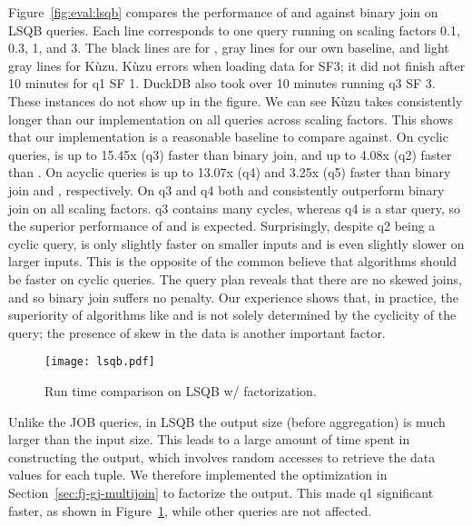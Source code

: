 Figure~\ref{fig:eval:lsqb} compares the performance of \FJ and \GJ against binary join on LSQB queries.
Each line corresponds to one query running on scaling factors 0.1, 0.3, 1, and 3.
The black lines are for \FJ, gray lines for our own \GJ baseline, and light gray lines for K\`uzu.
K\`uzu errors when loading data for SF3;
it did not finish after 10 minutes for q1 SF 1. 
DuckDB also took over 10 minutes running q3 SF 3. 
These instances do not show up in the figure.
We can see K\`uzu takes consistently longer than our \GJ implementation
 on all queries across scaling factors.
This shows that our \GJ implementation is a reasonable baseline to compare against.
On cyclic queries, \FJ is up to 15.45x (q3) faster than binary join, 
  and up to 4.08x (q2) faster than \GJ.
On acyclic queries \FJ is up to 13.07x (q4) and 3.25x (q5) faster than binary join and \GJ, respectively.
On q3 and q4 both \FJ and \GJ consistently outperform binary join on all scaling factors.
q3 contains many cycles, whereas q4 is a star query, so the superior performance of \FJ and \GJ is expected.
Surprisingly, despite q2 being a cyclic query, 
  \FJ is only slightly faster on smaller inputs
  and is even slightly slower on larger inputs.
This is the opposite of the common believe that \WCOJ algorithms
  should be faster on cyclic queries.
The query plan reveals that there are no skewed joins,
  and so binary join suffers no penalty.
Our experience shows that, in practice, 
  the superiority of \WCOJ algorithms like \FJ and \GJ
  is not solely determined by the cyclicity of the query;
  the presence of skew in the data is another important factor.

\begin{figure}
  \centering
  \texttt{[image: lsqb.pdf]}
  \caption{Run time comparison on LSQB w/ factorization.}
  \label{fig:eval:lsqb-factor}
\end{figure}

Unlike the JOB queries, in LSQB the output size (before aggregation)
  is much larger than the input size.
This leads to a large amount of time spent in constructing the output, 
  which involves random accesses to retrieve the data values for each tuple.
We therefore implemented the optimization in Section~\ref{sec:fj-gj-multijoin}
  to factorize the output.
This made q1 significant faster, as shown in Figure~\ref{fig:eval:lsqb-factor},
  while other queries are not affected.

